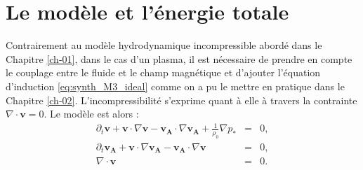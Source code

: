  \section{Le modèle et l'énergie totale}
 \label{sec-111}
 Contrairement au modèle hydrodynamique incompressible abordé dans le Chapitre \ref{ch-01}, dans le cas d'un plasma, il est nécessaire de prendre en compte le couplage entre le fluide et le champ magnétique et d'ajouter l'équation d'induction \eqref{eq:synth_M3_ideal} comme on a pu le mettre en pratique dans le Chapitre \ref{ch-02}. L'incompressibilité s'exprime quant à elle à travers la contrainte $\nabla \cdot \boldsymbol{v} = 0$. Le modèle  est alors :
 \begin{eqnarray}
 \label{eq:model_inc_v} \partial_t \boldsymbol{v} + \boldsymbol{v} \cdot \nabla \boldsymbol{v} -  \boldsymbol{v_A} \cdot \nabla \boldsymbol{v_A} + \frac{1}{\rho_0} \nabla p_* &=& 0, \\
 \label{eq:model_inc_b} \partial_t \boldsymbol{v_A} + \boldsymbol{v} \cdot \nabla \boldsymbol{v_A} -  \boldsymbol{v_A} \cdot \nabla \boldsymbol{v}&=& 0, \\
 \label{eq:model_inc_r} \nabla \cdot \boldsymbol{v} &=& 0.
 \end{eqnarray}
